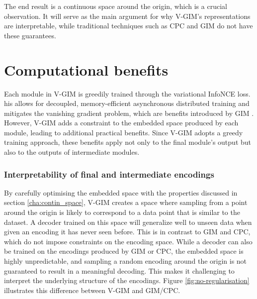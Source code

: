 			The end result is a continuous space around the origin, which is a crucial observation. It will serve as the main argument for why V-GIM's representations are interpretable, while traditional techniques such as CPC and GIM do not have these guarantees. 

			


		
	
	
	
\section{Computational benefits}
	Each module in V-GIM is greedily trained through the variational InfoNCE loss. his allows for decoupled, memory-efficient asynchronous distributed training and mitigates the vanishing gradient problem, which are benefits introduced by GIM \cite{lowePuttingEndEndtoEnd2020}. However, V-GIM adds a constraint to the embedded space produced by each module, leading to additional practical benefits. Since V-GIM adopts a greedy training approach, these benefits apply not only to the final module's output but also to the outputs of intermediate modules.
	

	\subsubsection{Interpretability of final and intermediate encodings}
		By carefully optimising the embedded space with the properties discussed in section \ref{cha:contin_space}, V-GIM creates a space where sampling from a point around the origin is likely to correspond to a data point that is similar to the dataset. A decoder trained on this space will generalize well to unseen data when given an encoding it has never seen before. This is in contrast to GIM and CPC, which do not impose constraints on the encoding space. While a decoder can also be trained on the encodings produced by GIM or CPC, the embedded space is highly unpredictable, and sampling a random encoding around the origin is not guaranteed to result in a meaningful decoding. This makes it challenging to interpret the underlying structure of the encodings. Figure \ref{fig:no-regularisation} illustrates this difference between V-GIM and GIM/CPC.
		
	
